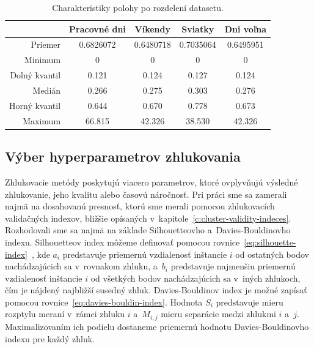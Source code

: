\documentclass[a4paper,twoside,slovak,12pt,appendix]{article}
\begin{document}
\begin{table}[htbp]
  \centering
  \caption{Charakteristiky polohy po rozdelení datasetu.}
  \label{tab:dataset-statistics}
  \begin{tabular}{|r|c|c|c|c|}
    \hline
					&  \textbf{Pracovné dni}  &	\textbf{Víkendy}	&	\textbf{Sviatky}	&	\textbf{Dni voľna} 	\\ \hline
		Priemer				&		0.6826072			&		0.6480718				&		0.7035064				&		0.6495951				 	\\ \hline
		Minimum				&		0							&		0								&		0								&		0								 	\\ \hline
		Dolný kvantil	&		0.121					&		0.124						&		0.127						&		0.124							\\ \hline
		Medián				&		0.266					&		0.275						&		0.303						&		0.276							\\ \hline
		Horný kvantil	&		0.644					&		0.670						&		0.778						&		0.673							\\ \hline
		Maximum				&		66.815				&		42.326					&		38.530					&		42.326						\\ \hline
  \end{tabular}
\end{table}

\subsection{Výber hyperparametrov zhlukovania}
\label{c:hyperparameter-selection}
Zhlukovacie metódy poskytujú viacero parametrov, ktoré ovplyvňujú výsledné
zhlukovanie, jeho kvalitu alebo časovú náročnosť. Pri práci sme sa zamerali
najmä na dosahovanú presnosť, ktorú sme merali pomocou zhlukovacích validačných
indexov, bližšie opísaných v~kapitole~\ref{c:cluster-validity-indeces}.
Rozhodovali sme sa najmä na základe Silhouetteovho a~Davies-Bouldinovho indexu.
Silhouetteov index môžeme definovať pomocou
rovnice~\ref{eq:silhouette-index}~\cite{Arbelaitz2013}, kde $a_i$ predstavuje
priemernú vzdialenosť inštancie $i$ od ostatných bodov nachádzajúcich sa
v~rovnakom zhluku, a~$b_i$ predstavuje najmenšiu priemernú vzdialenosť inštancie
$i$ od všetkých bodov nachádzajúcich sa v~iných zhlukoch, čím je nájdený
najbližší susedný zhluk. Davies-Bouldinov index je možné zapísať pomocou
rovnice~\ref{eq:davies-bouldin-index}\cite{Arbelaitz2013}. Hodnota $S_i$
predstavuje mieru rozptylu meraní v~rámci zhluku $i$ a~$M_{i, j}$ mieru
separácie medzi zhlukmi $i$ a~$j$. Maximalizovaním ich podielu dostaneme
priemernú hodnotu Davies-Bouldinovho indexu pre každý zhluk.
\end{document}
